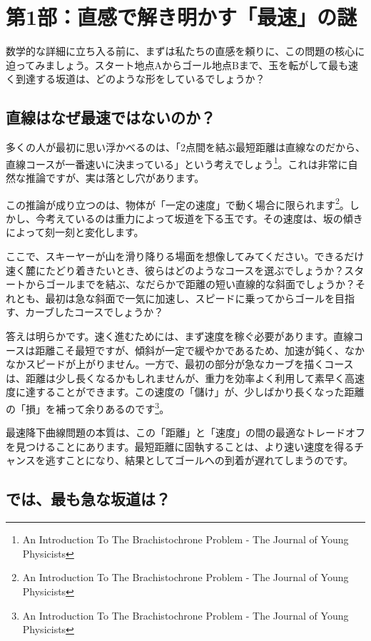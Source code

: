 \documentclass[a4paper,12pt]{bxjsarticle}
\begin{document}
\section{第1部：直感で解き明かす「最速」の謎}

数学的な詳細に立ち入る前に、まずは私たちの直感を頼りに、この問題の核心に迫ってみましょう。スタート地点Aからゴール地点Bまで、玉を転がして最も速く到達する坂道は、どのような形をしているでしょうか？

\subsection{直線はなぜ最速ではないのか？}

多くの人が最初に思い浮かべるのは、「2点間を結ぶ最短距離は直線なのだから、直線コースが一番速いに決まっている」という考えでしょう\footnote{An Introduction To The Brachistochrone Problem - The Journal of Young Physicists}。これは非常に自然な推論ですが、実は落とし穴があります。

この推論が成り立つのは、物体が「一定の速度」で動く場合に限られます\footnote{An Introduction To The Brachistochrone Problem - The Journal of Young Physicists}。しかし、今考えているのは重力によって坂道を下る玉です。その速度は、坂の傾きによって刻一刻と変化します。

ここで、スキーヤーが山を滑り降りる場面を想像してみてください。できるだけ速く麓にたどり着きたいとき、彼らはどのようなコースを選ぶでしょうか？スタートからゴールまでを結ぶ、なだらかで距離の短い直線的な斜面でしょうか？それとも、最初は急な斜面で一気に加速し、スピードに乗ってからゴールを目指す、カーブしたコースでしょうか？

答えは明らかです。速く進むためには、まず速度を稼ぐ必要があります。直線コースは距離こそ最短ですが、傾斜が一定で緩やかであるため、加速が鈍く、なかなかスピードが上がりません。一方で、最初の部分が急なカーブを描くコースは、距離は少し長くなるかもしれませんが、重力を効率よく利用して素早く高速度に達することができます。この速度の「儲け」が、少しばかり長くなった距離の「損」を補って余りあるのです\footnote{An Introduction To The Brachistochrone Problem - The Journal of Young Physicists}。

最速降下曲線問題の本質は、この「距離」と「速度」の間の最適なトレードオフを見つけることにあります。最短距離に固執することは、より速い速度を得るチャンスを逃すことになり、結果としてゴールへの到着が遅れてしまうのです。

\subsection{では、最も急な坂道は？}
\end{document}
